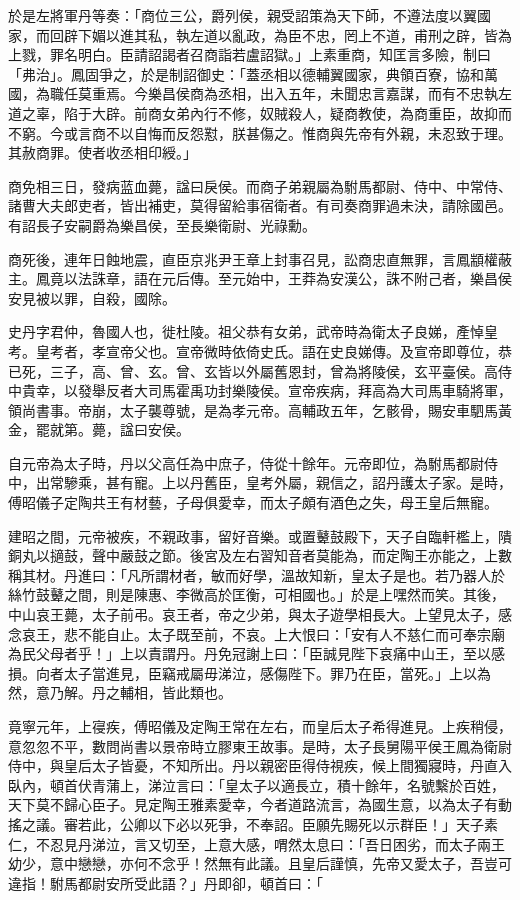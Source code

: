 \begin{pinyinscope}
於是左將軍丹等奏：「商位三公，爵列侯，親受詔策為天下師，不遵法度以翼國家，而回辟下媚以進其私，執左道以亂政，為臣不忠，罔上不道，甫刑之辟，皆為上戮，罪名明白。臣請詔謁者召商詣若盧詔獄。」上素重商，知匡言多險，制曰「弗治」。鳳固爭之，於是制詔御史：「蓋丞相以德輔翼國家，典領百寮，協和萬國，為職任莫重焉。今樂昌侯商為丞相，出入五年，未聞忠言嘉謀，而有不忠執左道之辜，陷于大辟。前商女弟內行不修，奴賊殺人，疑商教使，為商重臣，故抑而不窮。今或言商不以自悔而反怨懟，朕甚傷之。惟商與先帝有外親，未忍致于理。其赦商罪。使者收丞相印綬。」

商免相三日，發病蓝血薨，諡曰戾侯。而商子弟親屬為駙馬都尉、侍中、中常侍、諸曹大夫郎吏者，皆出補吏，莫得留給事宿衛者。有司奏商罪過未決，請除國邑。有詔長子安嗣爵為樂昌侯，至長樂衛尉、光祿勳。

商死後，連年日蝕地震，直臣京兆尹王章上封事召見，訟商忠直無罪，言鳳顓權蔽主。鳳竟以法誅章，語在元后傳。至元始中，王莽為安漢公，誅不附己者，樂昌侯安見被以罪，自殺，國除。

史丹字君仲，魯國人也，徙杜陵。祖父恭有女弟，武帝時為衛太子良娣，產悼皇考。皇考者，孝宣帝父也。宣帝微時依倚史氏。語在史良娣傳。及宣帝即尊位，恭已死，三子，高、曾、玄。曾、玄皆以外屬舊恩封，曾為將陵侯，玄平臺侯。高侍中貴幸，以發舉反者大司馬霍禹功封樂陵侯。宣帝疾病，拜高為大司馬車騎將軍，領尚書事。帝崩，太子襲尊號，是為孝元帝。高輔政五年，乞骸骨，賜安車駟馬黃金，罷就第。薨，諡曰安侯。

自元帝為太子時，丹以父高任為中庶子，侍從十餘年。元帝即位，為駙馬都尉侍中，出常驂乘，甚有寵。上以丹舊臣，皇考外屬，親信之，詔丹護太子家。是時，傅昭儀子定陶共王有材藝，子母俱愛幸，而太子頗有酒色之失，母王皇后無寵。

建昭之間，元帝被疾，不親政事，留好音樂。或置鼙鼓殿下，天子自臨軒檻上，隤銅丸以擿鼓，聲中嚴鼓之節。後宮及左右習知音者莫能為，而定陶王亦能之，上數稱其材。丹進曰：「凡所謂材者，敏而好學，溫故知新，皇太子是也。若乃器人於絲竹鼓鼙之間，則是陳惠、李微高於匡衡，可相國也。」於是上嘿然而笑。其後，中山哀王薨，太子前弔。哀王者，帝之少弟，與太子遊學相長大。上望見太子，感念哀王，悲不能自止。太子既至前，不哀。上大恨曰：「安有人不慈仁而可奉宗廟為民父母者乎！」上以責謂丹。丹免冠謝上曰：「臣誠見陛下哀痛中山王，至以感損。向者太子當進見，臣竊戒屬毋涕泣，感傷陛下。罪乃在臣，當死。」上以為然，意乃解。丹之輔相，皆此類也。

竟寧元年，上寑疾，傅昭儀及定陶王常在左右，而皇后太子希得進見。上疾稍侵，意忽忽不平，數問尚書以景帝時立膠東王故事。是時，太子長舅陽平侯王鳳為衛尉侍中，與皇后太子皆憂，不知所出。丹以親密臣得侍視疾，候上間獨寢時，丹直入臥內，頓首伏青蒲上，涕泣言曰：「皇太子以適長立，積十餘年，名號繫於百姓，天下莫不歸心臣子。見定陶王雅素愛幸，今者道路流言，為國生意，以為太子有動搖之議。審若此，公卿以下必以死爭，不奉詔。臣願先賜死以示群臣！」天子素仁，不忍見丹涕泣，言又切至，上意大感，喟然太息曰：「吾日困劣，而太子兩王幼少，意中戀戀，亦何不念乎！然無有此議。且皇后謹慎，先帝又愛太子，吾豈可違指！駙馬都尉安所受此語？」丹即卻，頓首曰：「


\end{pinyinscope}
